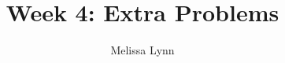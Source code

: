 \documentclass{ximera}
\title{Week 4: Extra Problems}
\author{Melissa Lynn}
\begin{document}
  
\begin{abstract}  
\end{abstract}  
\maketitle
\end{document}
